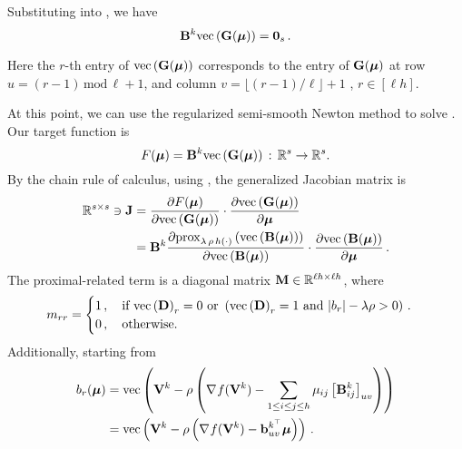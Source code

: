 Substituting  into , we have 
\begin{equation}\label{eq:ManPGLambda_G}
    \mathbf{B}^k\mathrm{vec}\left(\mathbf{G}(\boldsymbol{\mu})\right)=\boldsymbol{0}_{s}\,.
\end{equation}

Here the $r$-th entry of $\mathrm{vec}\left(\mathbf{G}(\boldsymbol{\mu})\right)$ corresponds to the entry of $\mathbf{G}(\boldsymbol{\mu})$ at row $ u=(r-1) \,\mathrm{mod}\, \ell + 1$, and column $v=\lfloor{(r-1) / \ell\rfloor} + 1$ , $r \in [\ell h]$. 

At this point, we can use the regularized semi-smooth Newton method  to solve .
Our target function is
\begin{equation}\label{eq:regNF}
    F(\boldsymbol{\mu})=\mathbf{B}^k\mathrm{vec}\left(\mathbf{G}(\boldsymbol{\mu})\right) \, :\, \mathbb{R}^s \rightarrow \mathbb{R}^s. 
\end{equation}
By the chain rule of calculus, using , the generalized Jacobian matrix is 
\begin{equation}\label{eq:genJ}
    \begin{aligned}
        \reall^{s \times s} \ni \mathbf{J} &= \pdv{F(\boldsymbol{\mu})}{\myvec{\G(\boldsymbol{\mu})}}\cdot \pdv{\myvec{\G(\boldsymbol{\mu})}}{\boldsymbol{\mu}} \\
        &= \mathbf{B}^k \pdv{\prox_{\lambda\, \rho\, h(\cdot)}\left(\myvec{\mathbf{B}(\boldsymbol{\mu})}\right)}{\myvec{\mathbf{B}(\boldsymbol{\mu})}}\cdot\pdv{\myvec{\mathbf{B}(\boldsymbol{\mu})}}{\boldsymbol{\mu}}\,.
    \end{aligned}
\end{equation}
The proximal-related term is a diagonal matrix $\mathbf{M} \in \mathbb{R}^{\ell h \times \ell h}$, where
\begin{equation}\label{eq:Jfirst}
    m_{rr} = \begin{cases}
        1\,,\quad \text{if } \mathrm{vec}\left(\mathbf{D}\right)_{r} = 0 \text{ or } \left(\mathrm{vec}\left(\mathbf{D}\right)_{r} = 1 \text{ and }\abs{b_{r}}-\lambda \rho >0\right)\,. \\
        0\,, \quad \text{otherwise}.
    \end{cases}
\end{equation}
Additionally, starting from
\begin{equation}
    \begin{aligned}
        b_r(\boldsymbol{\mu}) &= \mathrm{vec}\left(\mathbf{V}^k - \rho\left( \nabla_{} f(\mathbf{V}^k) - \sum_{1 \leq i \leq j \leq h} \mu_{ij} \left[\mathbf{B}_{ij}^k \right]_{uv} \right) \right) \\
        &= \mathrm{vec}\left(\mathbf{V}^k - \rho\left( \nabla_{} f(\mathbf{V}^k) - \mathbf{b}_{uv}^{k^\top} \boldsymbol{\mu} \right)\right)\,.        
    \end{aligned}
\end{equation}

